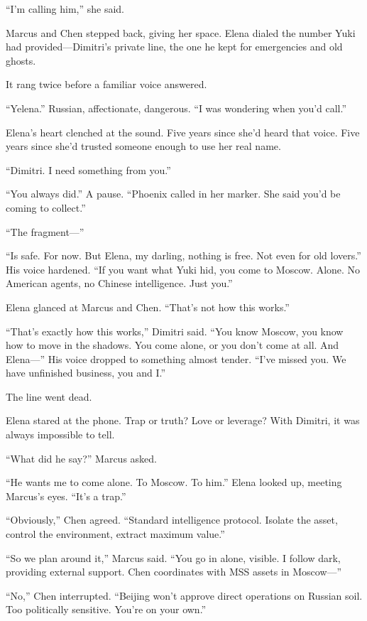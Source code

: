 \documentclass[12pt,letterpaper]{book}
\begin{document}
``I'm calling him,'' she said.

Marcus and Chen stepped back, giving her space. Elena dialed the number Yuki had provided---Dimitri's private line, the one he kept for emergencies and old ghosts.

It rang twice before a familiar voice answered.

``Yelena.'' Russian, affectionate, dangerous. ``I was wondering when you'd call.''

Elena's heart clenched at the sound. Five years since she'd heard that voice. Five years since she'd trusted someone enough to use her real name.

``Dimitri. I need something from you.''

``You always did.'' A pause. ``Phoenix called in her marker. She said you'd be coming to collect.''

``The fragment---''

``Is safe. For now. But Elena, my darling, nothing is free. Not even for old lovers.'' His voice hardened. ``If you want what Yuki hid, you come to Moscow. Alone. No American agents, no Chinese intelligence. Just you.''

Elena glanced at Marcus and Chen. ``That's not how this works.''

``That's exactly how this works,'' Dimitri said. ``You know Moscow, you know how to move in the shadows. You come alone, or you don't come at all. And Elena---'' His voice dropped to something almost tender. ``I've missed you. We have unfinished business, you and I.''

The line went dead.

Elena stared at the phone. Trap or truth? Love or leverage? With Dimitri, it was always impossible to tell.

``What did he say?'' Marcus asked.

``He wants me to come alone. To Moscow. To him.'' Elena looked up, meeting Marcus's eyes. ``It's a trap.''

``Obviously,'' Chen agreed. ``Standard intelligence protocol. Isolate the asset, control the environment, extract maximum value.''

``So we plan around it,'' Marcus said. ``You go in alone, visible. I follow dark, providing external support. Chen coordinates with MSS assets in Moscow---''

``No,'' Chen interrupted. ``Beijing won't approve direct operations on Russian soil. Too politically sensitive. You're on your own.''
\end{document}
